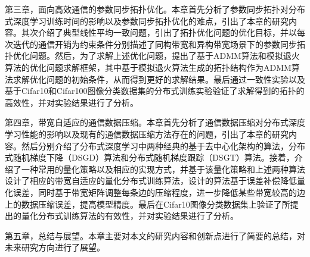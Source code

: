 第三章，面向高效通信的参数同步拓扑优化。本章首先分析了参数同步拓扑对分布式深度学习训练时间的影响以及参数同步拓扑优化的难点，引出了本章的研究内容。其次介绍了典型线性平均一致问题，引出了拓扑优化问题的优化目标，并以每次迭代的通信开销为约束条件分别描述了同构带宽和异构带宽场景下的参数同步拓扑优化问题。然后，为了求解上述优化问题，提出了基于ADMM算法和模拟退火算法的优化问题求解框架，其中基于模拟退火算法生成的拓扑结构作为ADMM算法求解优化问题的初始条件，从而得到更好的求解结果。最后通过一致性实验以及基于Cifar10和Cifar100图像分类数据集的分布式训练实验验证了求解得到的拓扑的高效性，并对实验结果进行了分析。

第四章，带宽自适应的通信数据压缩。本章首先分析了通信数据压缩对分布式深度学习性能的影响以及现有的通信数据压缩方法存在的问题，引出了本章的研究内容。然后分别介绍了分布式深度学习中两种经典的基于去中心化架构的算法，分布式随机梯度下降（DSGD）算法和分布式随机梯度跟踪（DSGT）算法。接着，介绍了一种常用的量化策略以及相应的实现方式，并基于该量化策略和上述两种算法设计了相应的带宽自适应的量化分布式训练算法，设计的算法基于误差补偿降低量化误差，同时基于带宽矩阵调整每条边的压缩程度，进一步降低某些带宽较高的边上的数据压缩误差，提高模型精度。最后在Cifar10图像分类数据集上验证了所提出的量化分布式训练算法的有效性，并对实验结果进行了分析。

第五章，总结与展望。本章主要对本文的研究内容和创新点进行了简要的总结，对未来研究方向进行了展望。
